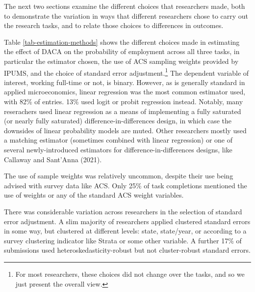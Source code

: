 \documentclass[
  letterpaper,
  DIV=11,
  numbers=noendperiod]{scrartcl}
\begin{document}
The next two sections examine the different choices that researchers
made, both to demonstrate the variation in ways that different
researchers chose to carry out the research tasks, and to relate those
choices to differences in outcomes.

Table \ref{tab-estimation-methods} shows the different choices made in
estimating the effect of DACA on the probability of employment across
all three tasks, in particular the estimator chosen, the use of ACS
sampling weights provided by IPUMS, and the choice of standard error
adjustment.\footnote{For most researchers, these choices did not change
  over the tasks, and so we just present the overall view.} The
dependent variable of interest, working full-time or not, is binary.
However, as is generally standard in applied microeconomics, linear
regression was the most common estimator used, with 82\% of entries.
13\% used logit or probit regression instead. Notably, many reserachers
used linear regression as a means of implementing a fully saturated (or
nearly fully saturated) difference-in-differences design, in which case
the downsides of linear probability models are muted. Other researchers
mostly used a matching estimator (sometimes combined with linear
regression) or one of several newly-introduced estimators for
difference-in-differences designs, like Callaway and Sant'Anna (2021).

The use of sample weights was relatively uncommon, despite their use
being advised with survey data like ACS. Only 25\% of task completions
mentioned the use of weights or any of the standard ACS weight
variables.

There was considerable variation across researchers in the selection of
standard error adjustment. A slim majority of researchers applied
clustered standard errors in some way, but clustered at different
levels: state, state/year, or according to a survey clustering indicator
like Strata or some other variable. A further 17\% of submissions used
heteroskedasticity-robust but not cluster-robust standard errors.
\end{document}
